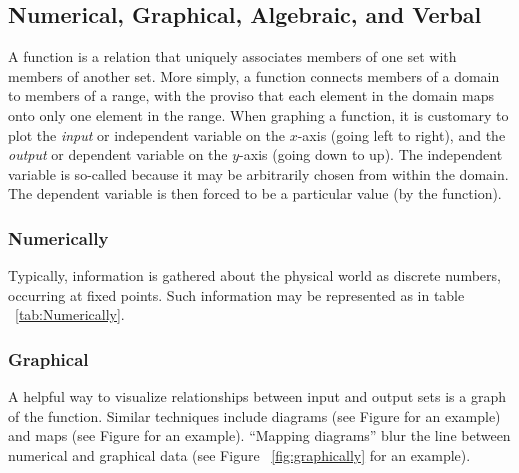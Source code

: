 
\subsection{Numerical, Graphical, Algebraic, and Verbal}





A \gls{function} is a relation that uniquely associates members of one \gls{set} 
with members of another set.  
More simply, a function connects members of a \gls{domain} to members of a \gls{range}, 
with the proviso that each element in the domain maps onto only one element in the range.  
When graphing a function, it is customary to plot the \emph{input} or \gls{independent variable} 
on the $x$-axis (going left to right), and the \emph{output} or \gls{dependent variable} on 
the $y$-axis (going down to up).  The independent variable is so-called because it may 
be arbitrarily chosen from within the domain.  The dependent 
variable is then forced to be a particular value (by the function).

\subsubsection{Numerically}
Typically, information is gathered about the physical world as \gls{discrete} numbers, 
occurring at fixed points. Such information may be represented as in  table ~\ref{tab:Numerically}.

    
    
\subsubsection{Graphical}
A helpful way to visualize relationships between input and output 
sets is a \gls{graph} of the function.  Similar techniques
include diagrams (see Figure for an example) and maps (see Figure for an example).  
``Mapping diagrams'' blur the line between numerical and graphical data 
(see Figure ~\ref{fig:graphically} for an example).

